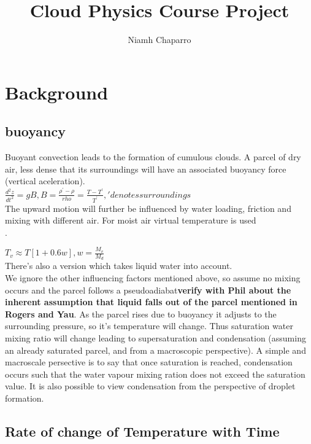 \documentclass[11pt]{article} %
\title{Cloud Physics Course Project}
\author{Niamh Chaparro}
\begin{document}
\maketitle

\section{Background}

\subsection{buoyancy}

Buoyant convection leads to the formation of cumulous clouds.  A parcel of dry air, less dense that its surroundings will have an associated buoyancy force (vertical aceleration).\\

$\frac{d^{2}z}{dt^{2}} = gB, B = \frac{\rho^{'} - \rho}{rho} = \frac{T - T^{'}}{T^{'}}, ' denotes surroundings$\\

The upward motion will further be influenced by water loading, friction and mixing with different air.  For moist air virtual temperature is used\\.  

$T_{v} \approx T[1 + 0.6w], w  = \frac{M_{v}}{M_{d}}$\\

There's also a version which takes liquid water into account.\\  

We ignore the other influencing factors mentioned above, so assume no mixing occurs and the parcel follows a pseudoadiabat{\bf verify with Phil about the inherent assumption that liquid falls out of the parcel mentioned in Rogers and Yau}.  As the parcel rises due to buoyancy it adjusts to the surrounding pressure, so it's temperature will change.  Thus saturation water mixing ratio will change leading to supersaturation and condensation (assuming an already saturated parcel, and from a macroscopic perspective).  A simple and macroscale persective is to say that once saturation is reached, condensation occurs such that the water vapour mixing ration does not exceed the saturation value.  It is also possible to view condensation from the perspective of droplet formation.

\subsection{Rate of change of Temperature with Time} 
\end{document}
